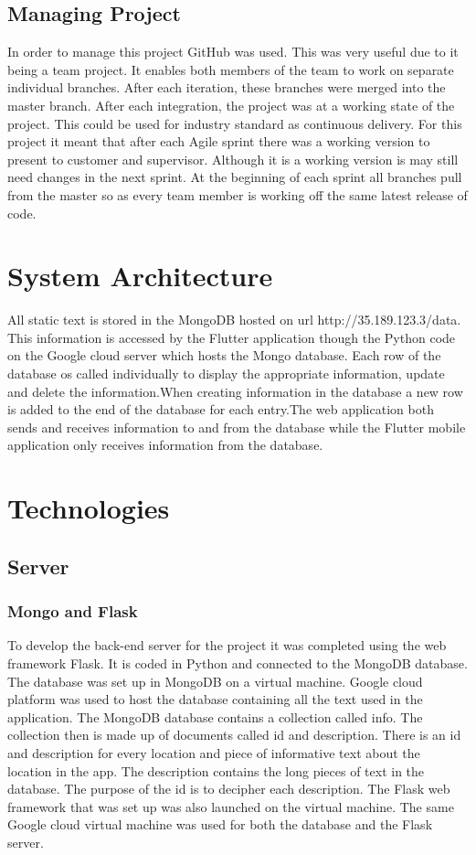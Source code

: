\subsection{Managing Project}
In order to manage this project GitHub was used. This was very useful due to it being a team project. It enables both members of the team to work on separate individual branches. After each iteration, these branches were merged into the master branch. After each integration, the project was at a working state of the project. This could be used for industry standard as continuous delivery. For this project it meant that after each Agile sprint there was a working version to present to customer and supervisor. Although it is a working version is may still need changes in the next sprint. At the beginning of each sprint all branches pull from the master so as every team member is working off the same latest release of code.
\section{System Architecture}
All static text is stored in the MongoDB hosted on url http://35.189.123.3/data. This information is accessed by the Flutter application though the Python code on the Google cloud server which hosts the Mongo database. Each row of the database os called individually to display the appropriate information, update and delete the information.When creating information in the database a new row is added to the end of the database for each entry.The web application both sends and receives information to and from the database while the Flutter mobile application only receives information from the database.
\section{Technologies}
\subsection{Server}
\subsubsection{Mongo and Flask}
To develop the back-end server for the project it was completed using the web framework Flask. It is coded in Python and connected to the MongoDB database. The database was set up in MongoDB on a virtual machine. Google cloud platform was used to host the database containing all the text used in the application. The MongoDB database contains a collection called info. The collection then is made up of documents called id and description. There is an id and description for every location and piece of informative text about the location in the app. The description contains the long pieces of text in the database. The purpose of the id is to decipher each description. The Flask web framework that was set up was also launched on the virtual machine. The same Google cloud virtual machine was used for both the database and the Flask server. 
